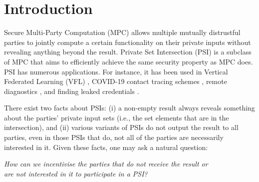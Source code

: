 





\section{Introduction}


Secure Multi-Party Computation (MPC)  allows multiple mutually distrustful parties to jointly compute a certain functionality on their private inputs without revealing anything beyond the result. Private Set Intersection (PSI) is a subclass of MPC that aims to efficiently achieve the same security property as MPC does. %
%
PSI has numerous applications. For instance, it has  been used  in Vertical Federated Learning (VFL) \cite{LuD20}, COVID-19 contact tracing schemes  \cite{DBLP:conf/asiacrypt/DuongPT20},  remote diagnostics \cite{BrickellPSW07}, and finding leaked credentials \cite{ThomasPYRKIBPPB19}. %



There exist two facts about PSIs: (i) a non-empty result always reveals something about the parties' private input sets (i.e., the set elements that are in the intersection), and (ii) various variants of PSIs do not output the result to all parties, even in those PSIs that do,  not all of the parties are necessarily interested in it.  Given these facts, one may ask a natural question:  




\begin{center}
\emph{How can we incentivise the parties that do not receive the result or\\ are not interested in it to participate in a PSI?}
\end{center}



